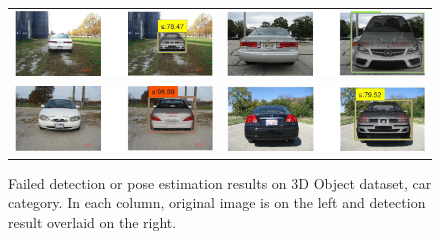 \documentclass[10pt,twocolumn,letterpaper]{article}
\begin{document}
\begin{figure}[h]
\setlength\tabcolsep{1pt}
\centering
\begin{tabular}{|c|c|}
  \hline
  \includegraphics[width=0.40\linewidth]{supp/car13.png} &
  \includegraphics[width=0.40\linewidth]{supp/car30.png} \\ 
  \includegraphics[width=0.40\linewidth]{supp/car18.png} &
  \includegraphics[width=0.40\linewidth]{supp/car25.png} \\
  \hline
  \end{tabular}
\caption{Failed detection or pose estimation results on 3D Object dataset, car
category. In each column, original image is on the left and detection result overlaid
on the right.}%
  \label{fig:3dobject_car_bad}
\end{figure}
\end{document}
